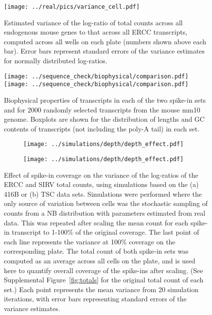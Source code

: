 \documentclass{article}
\begin{document}
\begin{figure}[btp]
    \begin{center}
        \texttt{[image: ../real/pics/variance\_cell.pdf]}
    \end{center}
    \caption{Estimated variance of the log-ratio of total counts across all endogenous mouse genes to that across all ERCC transcripts, computed across all wells on each plate (numbers shown above each bar).
        Error bars represent standard errors of the variance estimates for normally distributed log-ratios.
    }
\end{figure}

\begin{figure}[btp]
    \begin{center}
        \texttt{[image: ../sequence\_check/biophysical/comparison.pdf]}
        \texttt{[image: ../sequence\_check/biophysical/comparison.pdf]}
    \end{center}
    \caption{Biophysical properties of transcripts in each of the two spike-in sets and for 2000 randomly selected transcripts from the mouse mm10 genome.
    Boxplots are shown for the distribution of lengths and GC contents of transcripts (not including the poly-A tail) in each set.
}
\end{figure}

\begin{figure}[btp]
    \begin{center}
        \begin{subfigure}{0.49\textwidth}
            \texttt{[image: ../simulations/depth/depth\_effect.pdf]}
            \caption{}
        \end{subfigure}
        \begin{subfigure}{0.49\textwidth}
            \texttt{[image: ../simulations/depth/depth\_effect.pdf]}
            \caption{}
        \end{subfigure}
    \end{center}
    \caption{Effect of spike-in coverage on the variance of the log-ratios of the ERCC and SIRV total counts, using simulations based on the (a) 416B or (b) TSC data sets.
        Simulations were performed where the only source of variation between cells was the stochastic sampling of counts from a NB distribution with parameters estimated from real data.
        This was repeated after scaling the mean count for each spike-in transcript to 1-100\% of the original coverage. 
        The last point of each line represents the variance at 100\% coverage on the corresponding plate.
        The total count of both spike-in sets was computed as an average across all cells on the plate, and is used here to quantify overall coverage of the spike-ins after scaling. 
        (See Supplemental Figure~\ref{fig:totals} for the original total count of each set.)
        Each point represents the mean variance from 20 simulation iterations, with error bars representing standard errors of the variance estimates.
    }
    \label{fig:sampledepth}
\end{figure}
\end{document}
